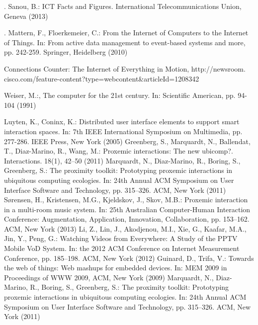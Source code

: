 \documentclass[runningheads,a4paper]{llncs}
\begin{document}
\begin{thebibliography}{4}

 . Sanou, B.: ICT Facts and Figures. International Telecommunications Union, Geneva
(2013)

 . Mattern, F., Floerkemeier, C.: From the Internet of Computers to the Internet of
Things. In: From active data management to event-based systems and more, pp.
242-259. Springer, Heidelberg (2010)


 Connections Counter: The Internet of Everything in Motion, http://newsroom.
cisco.com/feature-content?type=webcontent&articleId=1208342 

 Weiser, M.:, The computer for the 21st century. In: Scientific American, pp. 94-104
(1991)

Luyten, K., Coninx, K.: Distributed user interface elements to support smart interaction spaces. In: 7th IEEE International Symposium on Multimedia, pp. 277-286.
IEEE Press, New York (2005)
Greenberg, S., Marquardt, N., Ballendat, T., Diaz-Marino, R., Wang, M.: Proxemic
interactions: The new ubicomp?. Interactions. 18(1), 42–50 (2011)
  Marquardt, N., Diaz-Marino, R., Boring, S., Greenberg, S.: The proximity toolkit:
Prototyping proxemic interactions in ubiquitous computing ecologies. In: 24th Annual ACM Symposium on User Interface Software and Technology, pp. 315–326.
ACM, New York (2011)
 Sørensen, H., Kristensen, M.G., Kjeldskov, J., Skov, M.B.: Proxemic interaction
in a multi-room music system. In: 25th Australian Computer-Human Interaction
Conference: Augmentation, Application, Innovation, Collaboration, pp. 153–162.
ACM, New York (2013) 
Li, Z., Lin, J., Akodjenou, M.I., Xie, G., Kaafar, M.A., Jin, Y., Peng, G.: Watching
Videos from Everywhere: A Study of the PPTV Mobile VoD System. In: the 2012
ACM Conference on Internet Measurement Conference, pp. 185–198. ACM, New
York (2012)
Guinard, D., Trifa, V.: Towards the web of things: Web mashups for embedded
devices. In: MEM 2009 in Proceedings of WWW 2009, ACM, New York (2009)
  Marquardt, N., Diaz-Marino, R., Boring, S., Greenberg, S.: The proximity toolkit:
Prototyping proxemic interactions in ubiquitous computing ecologies. In: 24th Annual ACM Symposium on User Interface Software and Technology, pp. 315–326.
ACM, New York (2011)
\end{thebibliography}
\end{document}
